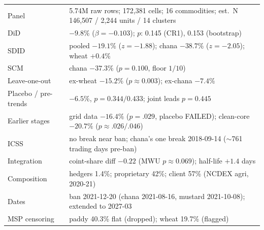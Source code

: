 \documentclass[11pt]{article}
\begin{document}
\begin{center}\small
\begin{tabular}{ll}
\toprule
Panel & 5.74M raw rows; 172{,}381 cells; 16 commodities; est.\ N 146{,}507 / 2{,}244 units / 14 clusters \\
DiD & $-9.8\%$ ($\beta=-0.103$); $p$: 0.145 (CR1), 0.153 (bootstrap) \\
SDID & pooled $-19.1\%$ ($z=-1.88$); chana $-38.7\%$ ($z=-2.05$); wheat $+0.4\%$ \\
SCM & chana $-37.3\%$ ($p=0.100$, floor $1/10$) \\
Leave-one-out & ex-wheat $-15.2\%$ ($p\approx0.003$); ex-chana $-7.4\%$ \\
Placebo / pre-trends & $-6.5\%$, $p=0.344/0.433$; joint leads $p=0.445$ \\
Earlier stages & grid data $-16.4\%$ ($p=.029$, placebo FAILED); clean-core $-20.7\%$ ($p\approx.026/.046$) \\
ICSS & no break near ban; chana's one break 2018-09-14 ($\sim$761 trading days pre-ban) \\
Integration & coint-share diff $-0.22$ (MWU $p\approx0.069$); half-life $+1.4$ days \\
Composition & hedgers 1.4\%; proprietary 42\%; client 57\% (NCDEX agri, 2020-21) \\
Dates & ban 2021-12-20 (chana 2021-08-16, mustard 2021-10-08); extended to 2027-03 \\
MSP censoring & paddy 40.3\% flat (dropped); wheat 19.7\% (flagged) \\
\bottomrule
\end{tabular}
\end{center}
\end{document}
